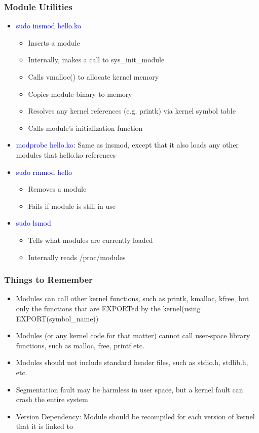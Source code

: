 \documentclass[12pt]{article}
\begin{document}
\subsubsection{Module Utilities}
\begin{itemize}
    \item \textcolor{blue}{sudo insmod hello.ko} \begin{itemize}
        \item Inserts a module
        \item Internally, makes a call to sys\_init\_module
        \item Calls vmalloc() to allocate kernel memory
        \item Copies module binary to memory
        \item Resolves any kernel references (e.g. printk) via kernel symbol table
        \item Calls module’s initialization function
    \end{itemize}
    \item \textcolor{blue}{modprobe hello.ko}: Same as insmod, except that it also loads any other modules that hello.ko references
    \item \textcolor{blue}{sudo rmmod hello} \begin{itemize}
        \item Removes a module
        \item Fails if module is still in use
    \end{itemize}
    \item \textcolor{blue}{sudo lsmod} \begin{itemize}
        \item Tells what modules are currently loaded 
        \item Internally reads /proc/modules
    \end{itemize}
\end{itemize}
\subsubsection{Things to Remember}
\begin{itemize}
    \item Modules can call other kernel functions, such as printk, kmalloc, kfree, but only the functions that are EXPORTed by the kernel(using EXPORT(symbol\_name))
    \item Modules (or any kernel code for that matter) cannot call user-space library functions, such as  malloc, free, printf etc.
    \item Modules should not include standard header files, such as stdio.h, stdlib.h, etc.
    \item Segmentation fault may be harmless in user space, but a kernel fault can crash the entire system
    \item Version Dependency: Module should be recompiled for each version of kernel that it is linked to
\end{itemize}
\end{document}
